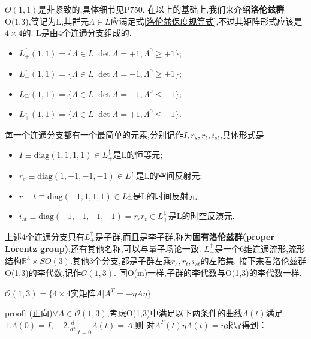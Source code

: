 \documentclass[../main.tex]{subfiles}
\begin{document}
$O(1,1)$是非紧致的,具体细节见P750.
在以上的基础上,我们来介绍\textbf{洛伦兹群}O(1,3),简记为L,其群元$\Lambda \in L$应满足式\ref{洛伦兹保度规等式},不过其矩阵形式应该是$4\times4$的.
L是由4个连通分支组成的.
\begin{itemize}
    \item $L^\uparrow_+(1,1)  =\{\Lambda \in L | \det\Lambda = +1, \Lambda^0{} \ge +1\}$;  
    \item $L^\uparrow_-(1,1)  =\{\Lambda \in L | \det\Lambda = -1, \Lambda^0{} \ge +1\}$;  
    \item $L^\downarrow_-(1,1)=\{\Lambda \in L | \det\Lambda = -1, \Lambda^0{} \le -1\}$;
    \item $L^\downarrow_+(1,1)=\{\Lambda \in L | \det\Lambda = +1, \Lambda^0{} \le -1\}$.
\end{itemize}
每一个连通分支都有一个最简单的元素,分别记作$I,r_s,r_t,i_{st}$,具体形式是
\begin{itemize}
    \item $ I\equiv \text{diag}(1,1,1,1)\in L^\uparrow_+  $是L的恒等元;
    \item $ r_s\equiv \text{diag}(1,-1,-1,-1)\in L^\uparrow_- $是L的空间反射元;
    \item $ r-t\equiv \text{diag}(-1,1,1,1)\in L^\downarrow_-$是L的时间反射元;
    \item $ i_{st}\equiv \text{diag}(-1,-1,-1,-1) = r_s r_t\in L^\downarrow_+$是L的时空反演元.  
\end{itemize}
  上述4个连通分支只有$L^\uparrow_+$是子群,而且是李子群,称为\textbf{固有洛伦兹群(proper Lorentz group)},还有其他名称,可以与量子场论一致.
$L^\uparrow_+$是一个6维连通流形,流形结构$\mathbb{R}^3 \times SO(3)$.其他3个分支,都是子群左乘$r_s,r_t,i_{st}$的左陪集.
接下来看洛伦兹群O(1,3)的李代数,记作$\mathscr{O}(1,3)$.
同O(m)一样,子群的李代数与O(1,3)的李代数一样.
\begin{theorem}
    $\mathscr{O}(1,3) = \{4\times 4 \text{实矩阵}A | A^T = -\eta A \eta\}$
\end{theorem}
proof: (正向)$\forall A \in \mathscr{O}(1,3)$,考虑O(1,3)中满足以下两条件的曲线$\Lambda(t)$满足$1. \Lambda(0) = I,\quad 2. \left. \frac{d}{dt}\right|_{t=0}\Lambda(t) = A$,则
对$ \Lambda^T(t)\eta \Lambda(t) = \eta $求导得到：
\end{document}
